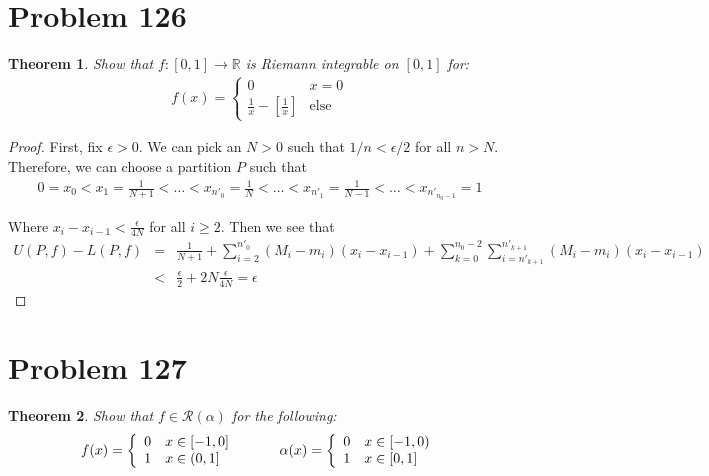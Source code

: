 \documentclass[psamsfonts]{amsart}
\newtheorem{thm}{Theorem}[section]
\theoremstyle{definition}
\theoremstyle{remark}
\numberwithin{equation}{section}
\begin{document}
\section{Problem 126}

\begin{thm}
Show that $f:[0,1] \to \mathbb{R}$ is Riemann integrable on $[0,1]$ for:
\begin{eqnarray}
f(x) = \left\{ \begin{array}{ll}
0 & x = 0 \\
\frac{1}{x} - \left[ \frac{1}{x} \right] & \mathrm{else}
\end{array} \right.
\end{eqnarray}
\end{thm}

\begin{proof}
First, fix $\epsilon > 0$. We can pick an $N > 0$ such that $1/n < \epsilon / 2$ for all $n > N$. Therefore, we can choose a partition $P$ such that
\begin{eqnarray}
0 = x_0 < x_1 = \frac{1}{N+1} < \ldots < x_{n'_0} = \frac{1}{N} < \ldots < x_{n'_1} = \frac{1}{N-1} < \ldots < x_{n'_{n_0-1}} = 1
\end{eqnarray}

Where $x_i - x_{i-1} < \frac{\epsilon}{4 N}$ for all $i \geq 2$. Then we see that
\begin{eqnarray}
U(P,f) - L(P,f) &=& \frac{1}{N+1} + \sum_{i=2}^{n'_0} (M_i - m_i) (x_i - x_{i-1}) + \sum_{k=0}^{n_0-2} \sum_{i = n'_{k+1}}^{n'_{k+1}} (M_i - m_i) (x_i - x_{i-1}) \\
&<& \frac{\epsilon}{2} + 2N \frac{\epsilon}{4 N} = \epsilon
\end{eqnarray}
\end{proof}

\section{Problem 127}

\begin{thm}
Show that $f \in \mathscr{R}(\alpha)$ for the following:
\begin{eqnarray}
f(x) = \left\{ \begin{array}{ll}
0 & x \in [-1,0] \\
1 & x \in (0,1] \end{array} \right. 
\hspace{1cm}
\alpha(x) = \left\{ \begin{array}{l l}
0 & x \in [-1,0) \\
1 & x \in [0,1] \end{array} \right.
\end{eqnarray}
\end{thm}
\end{document}

